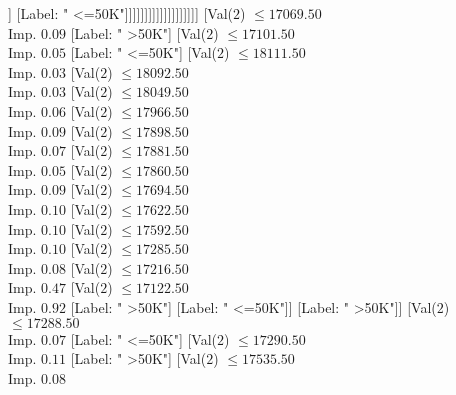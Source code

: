 \documentclass[margin=10pt]{standalone}
\begin{document}
\begin{forest}
																																											[Label: " <=50K"]
																																											[Label: " >50K"]]
																																										[Label: " <=50K"]]]]]]]]]]]]]]]]]]]
																								[Val($2$) $ \leq 17069.50$ \\ Imp. $0.09$
																									[Label: " >50K"]
																									[Val($2$) $ \leq 17101.50$ \\ Imp. $0.05$
																										[Label: " <=50K"]
																										[Val($2$) $ \leq 18111.50$ \\ Imp. $0.03$
																											[Val($2$) $ \leq 18092.50$ \\ Imp. $0.03$
																												[Val($2$) $ \leq 18049.50$ \\ Imp. $0.06$
																													[Val($2$) $ \leq 17966.50$ \\ Imp. $0.09$
																														[Val($2$) $ \leq 17898.50$ \\ Imp. $0.07$
																															[Val($2$) $ \leq 17881.50$ \\ Imp. $0.05$
																																[Val($2$) $ \leq 17860.50$ \\ Imp. $0.09$
																																	[Val($2$) $ \leq 17694.50$ \\ Imp. $0.10$
																																		[Val($2$) $ \leq 17622.50$ \\ Imp. $0.10$
																																			[Val($2$) $ \leq 17592.50$ \\ Imp. $0.10$
																																				[Val($2$) $ \leq 17285.50$ \\ Imp. $0.08$
																																					[Val($2$) $ \leq 17216.50$ \\ Imp. $0.47$
																																						[Val($2$) $ \leq 17122.50$ \\ Imp. $0.92$
																																							[Label: " >50K"]
																																							[Label: " <=50K"]]
																																						[Label: " >50K"]]
																																					[Val($2$) $ \leq 17288.50$ \\ Imp. $0.07$
																																						[Label: " <=50K"]
																																						[Val($2$) $ \leq 17290.50$ \\ Imp. $0.11$
																																							[Label: " >50K"]
																																							[Val($2$) $ \leq 17535.50$ \\ Imp. $0.08$

\end{forest}
\end{document}

